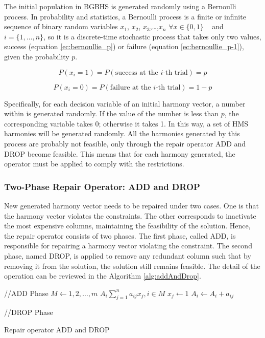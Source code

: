 The initial population in BGBHS is generated randomly using a Bernoulli process. In probability and statistics, a Bernoulli process is a finite or infinite sequence of binary random variables $x_1$, $x_2$, $x_3$,\dots,$x_n$  $\forall x \in \{0,1\}$ ~ and ~ $i=\{1,\dots, n\}$, so it is a discrete-time stochastic process that takes only two values, success (equation \ref{ec:bernoullie_p}) or failure (equation \ref{ec:bernoullie_p-1}), given the probability $p$.

\begin{equation} \label{ec:bernoullie_p} 
P(x_i=1) = P(\text{success at the $i$-th trial}) = p 
\end{equation}	

\begin{equation} \label{ec:bernoullie_p-1} 
P(x_i=0) = P(\text{failure at the $i$-th trial}) = 1-p
\end{equation}	

Specifically, for each decision variable of an initial harmony vector, a number within is generated randomly. If the value of the number is less than $p$, the corresponding variable takes 0; otherwise it takes 1. In this way, a set of HMS harmonies will be generated randomly. All the harmonies generated by this process are probably not feasible, only through the repair operator ADD and DROP become feasible. This means that for each harmony generated, the operator must be applied to comply with the restrictions.

\subsubsection{Two-Phase Repair Operator: ADD and DROP}\label{subAddAndDrop}
New generated harmony vector needs to be repaired under two cases. One is that the harmony vector violates the constraints. The other corresponds to inactivate the most expensive columns, maintaining the feasibility of the solution. Hence, the repair operator consists of two phases. The first phase, called ADD, is responsible for repairing a harmony vector violating the constraint. The second phase, named DROP, is applied to remove any redundant column such that by removing it from the solution, the solution still remains feasible. The detail of the operation can be reviewed in the Algorithm \ref{alg:addAndDrop}.

\begin{algorithm}
\begin{algorithmic}[1]
 \STATE //ADD Phase
\STATE $M \gets 1,2,\ldots, m$
\STATE $A_i \sum_{j=1}^{n} a_{ij}x_{j}, i \in M$
 {
	 {
		\STATE $x_j \gets 1$
		\STATE $A_i \gets A_i + a_{ij}$
	}\ENDIF
} \ENDFOR

\STATE //DROP Phase
 \ENDFOR

\caption{Repair operator ADD and DROP}\label{alg:addAndDrop}
\end{algorithmic}
\end{algorithm}


